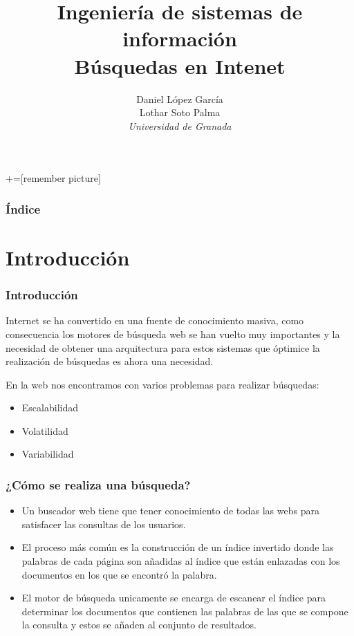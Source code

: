 \documentclass[9pt]{beamer} %
\author[Universidad de Granada]{Daniel López García\\ Lothar Soto Palma\\\textit{Universidad de Granada}}
\title{Ingeniería de sistemas de información\\ Búsquedas en Intenet}
\begin{document}
+=[remember picture]

\everymath{\displaystyle}

\begin{frame}
\titlepage
\end{frame}

\begin{frame}
\frametitle{Índice}
\tableofcontents
\end{frame}
	\section{Introducción}
\begin{frame}

	\frametitle{Introducción}
	Internet se ha convertido en una fuente de conocimiento masiva, como consecuencia los motores de búsqueda web se han vuelto muy importantes y la necesidad de obtener una arquitectura para estos sistemas que óptimice la realización de búsquedas es ahora una necesidad.
	
	\medskip
	En la web nos encontramos con varios problemas para realizar búsquedas:
		\begin{itemize}
			\item Escalabilidad
			\item Volatilidad 
			\item Variabilidad
		\end{itemize}
\end{frame}
\begin{frame}
	\frametitle{¿Cómo se realiza una búsqueda?}
	\begin{itemize}
		\item 	Un buscador web tiene que tener conocimiento de todas las webs para satisfacer las consultas de
		los usuarios.
		\item El proceso
		más común es la construcción de un índice invertido donde las palabras de cada página son
		añadidas al índice que están enlazadas con los documentos en los que se encontró la palabra.
		\item El
		motor de búsqueda unicamente se encarga de escanear el índice para determinar los documentos
		que contienen las palabras de las que se compone la consulta y estos se añaden al conjunto de
		resultados.
	\end{itemize}
 
\end{frame}
\end{document}
